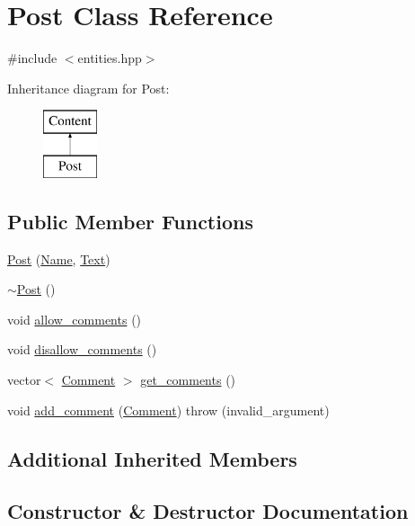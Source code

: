 \hypertarget{class_post}{}\section{Post Class Reference}
\label{class_post}


{\ttfamily \#include $<$entities.\+hpp$>$}

Inheritance diagram for Post\+:\begin{figure}[H]
\begin{center}
\leavevmode
\includegraphics[height=2.000000cm]{class_post}
\end{center}
\end{figure}
\subsection*{Public Member Functions}
\begin{DoxyCompactItemize}
\item 
\hyperlink{class_post_ae548a55c0bfa09e805cd0a19b07db365}{Post} (\hyperlink{class_name}{Name}, \hyperlink{class_text}{Text})
\item 
\hyperlink{class_post_a6c1e585c0adb3220a154ba20d2144ae1}{$\sim$\+Post} ()
\item 
void \hyperlink{class_post_a8172722471012d2a6ede1a0b10c7f756}{allow\+\_\+comments} ()
\item 
void \hyperlink{class_post_ab2bf16185ad34d5cfca23785bc2a95e6}{disallow\+\_\+comments} ()
\item 
vector$<$ \hyperlink{class_comment}{Comment} $>$ \hyperlink{class_post_a026bd803b219f1cb373d3041c53261eb}{get\+\_\+comments} ()
\item 
void \hyperlink{class_post_a882ef59148fa556833a68fbdedce58da}{add\+\_\+comment} (\hyperlink{class_comment}{Comment})  throw (invalid\+\_\+argument)
\end{DoxyCompactItemize}
\subsection*{Additional Inherited Members}


\subsection{Constructor \& Destructor Documentation}
\mbox{\label{class_post_ae548a55c0bfa09e805cd0a19b07db365}} 
